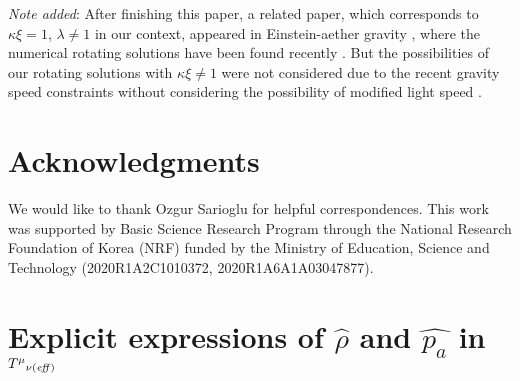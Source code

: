 \documentclass[preprint,aps,tightenlines,showkeys,nofootinbib,superscriptaddress]{revtex4}
\newcommand{\ka}{\kappa}
\newcommand{\la}{{\lambda}}
\newcommand{\m}{{\mu}}
\newcommand{\n}{{\nu}}
\begin{document}
{\it Note added}: After finishing this paper, a related paper, which corresponds to $\ka \xi=1$, $\la \neq 1$ in our context, appeared in Einstein-aether gravity \cite{Fran:2023}, where the numerical rotating solutions have been found recently \cite{Adam:2021}. But the possibilities of our rotating solutions with $\ka \xi \neq 1$ were not considered due to the recent gravity speed constraints \cite{LIGO:2017} without considering the possibility of modified light speed \cite{Emir:2017,Gong:2018}.

\section*{Acknowledgments}

We would like to thank Ozgur Sarioglu for helpful correspondences.
This work was supported by Basic Science Research Program through the National
Research Foundation of Korea (NRF) funded by the Ministry of Education,
Science and Technology {(2020R1A2C1010372, 2020R1A6A1A03047877)}.

\appendix

\section{Explicit expressions of $\widehat{\rho}$ and $\widehat{p_a}$ in
${T^{\m}}_{\n (\it{eff})}$
}
\end{document}
